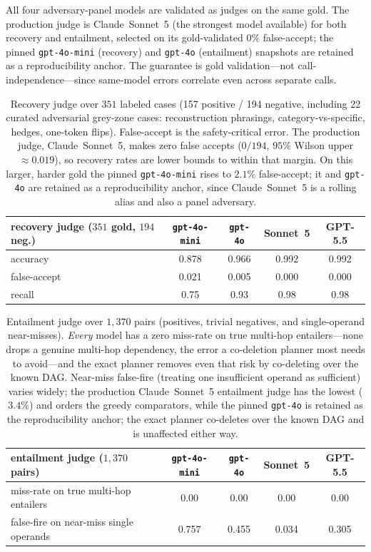 \documentclass[11pt]{article}
\begin{document}
All four adversary-panel models are validated as judges on the same gold. The production
judge is Claude~Sonnet~5 (the strongest model available) for both recovery and entailment,
selected on its gold-validated $0\%$ false-accept; the pinned \texttt{gpt-4o-mini}
(recovery) and \texttt{gpt-4o} (entailment) snapshots are retained as a reproducibility
anchor. The guarantee is gold validation---not call-independence---since same-model errors
correlate even across separate calls.

\begin{table}[h]
\centering
\begin{tabular}{@{}lcccc@{}}
\toprule
recovery judge ($351$ gold, $194$ neg.) & \texttt{gpt-4o-mini} & \texttt{gpt-4o} & Sonnet~5 & GPT-5.5 \\
\midrule
accuracy      & 0.878 & 0.966 & 0.992 & 0.992 \\
false-accept  & 0.021 & 0.005 & 0.000 & 0.000 \\
recall        & 0.75  & 0.93  & 0.98  & 0.98 \\
\bottomrule
\end{tabular}
\caption{Recovery judge over $351$ labeled cases (157 positive / 194 negative, including 22
curated adversarial grey-zone cases: reconstruction phrasings, category-vs-specific,
hedges, one-token flips). False-accept is the safety-critical error. The production judge,
Claude~Sonnet~5, makes zero false accepts ($0/194$, $95\%$ Wilson upper $\approx0.019$), so
recovery rates are lower bounds to within that margin. On this larger, harder gold the
pinned \texttt{gpt-4o-mini} rises to $2.1\%$ false-accept; it and \texttt{gpt-4o} are
retained as a reproducibility anchor, since Claude~Sonnet~5 is a rolling alias and also a
panel adversary.}
\end{table}

\begin{table}[h]
\centering
\begin{tabular}{@{}lcccc@{}}
\toprule
entailment judge ($1{,}370$ pairs) & \texttt{gpt-4o-mini} & \texttt{gpt-4o} & Sonnet~5 & GPT-5.5 \\
\midrule
miss-rate on true multi-hop entailers    & 0.00 & 0.00 & 0.00 & 0.00 \\
false-fire on near-miss single operands  & 0.757 & 0.455 & 0.034 & 0.305 \\
\bottomrule
\end{tabular}
\caption{Entailment judge over $1{,}370$ pairs (positives, trivial negatives, and
single-operand near-misses). \emph{Every} model has a zero miss-rate on true multi-hop
entailers---none drops a genuine multi-hop dependency, the error a co-deletion planner
most needs to avoid---and the exact planner removes even that risk by co-deleting over the
known DAG. Near-miss false-fire (treating one insufficient operand as sufficient) varies
widely; the production Claude~Sonnet~5 entailment judge has the lowest ($3.4\%$) and orders
the greedy comparators, while the pinned \texttt{gpt-4o} is retained as the reproducibility
anchor; the exact planner co-deletes over the known DAG and is unaffected either way.}
\end{table}
\end{document}
